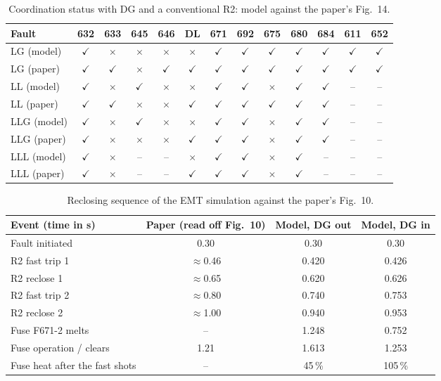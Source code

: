 \documentclass[12pt,a4paper]{article}
\newcommand{\ok}{\cellcolor{okc}$\checkmark$}
\newcommand{\no}{\cellcolor{noc}$\times$}
\begin{document}
\begin{table}[H]
\centering\footnotesize
\setlength{\tabcolsep}{4.5pt}
\begin{tabular}{|l|c|c|c|c|c|c|c|c|c|c|c|c|}
\hline
\textbf{Fault} & 632 & 633 & 645 & 646 & DL & 671 & 692 & 675 & 680 & 684 & 611 & 652 \\ \hline
LG (model) & \ok & \no & \no & \no & \no & \ok & \ok & \ok & \ok & \ok & \ok & \ok \\ \hline
LG (paper) & \ok & \ok & \no & \ok & \ok & \ok & \ok & \ok & \ok & \ok & \ok & \ok \\ \hline
LL (model) & \ok & \no & \ok & \no & \no & \ok & \ok & \no & \ok & \ok & -- & -- \\ \hline
LL (paper) & \ok & \ok & \no & \no & \ok & \ok & \ok & \ok & \ok & \ok & -- & -- \\ \hline
LLG (model) & \ok & \no & \ok & \no & \no & \ok & \ok & \no & \ok & \ok & -- & -- \\ \hline
LLG (paper) & \ok & \no & \no & \no & \ok & \ok & \ok & \no & \ok & \ok & -- & -- \\ \hline
LLL (model) & \ok & \no & -- & -- & \no & \ok & \ok & \no & \ok & -- & -- & -- \\ \hline
LLL (paper) & \ok & \no & -- & -- & \ok & \ok & \ok & \no & \ok & -- & -- & -- \\ \hline
\end{tabular}
\caption{Coordination status with DG and a conventional R2: model against the paper's Fig.~14.}
\label{tab:e5}
\end{table}

\begin{table}[H]
\centering\small
\begin{tabular}{|l|c|c|c|}
\hline
\textbf{Event (time in s)} & \textbf{Paper (read off Fig.~10)} & \textbf{Model, DG out} & \textbf{Model, DG in} \\ \hline
Fault initiated & 0.30 & 0.30 & 0.30 \\ \hline
R2 fast trip 1 & $\approx$0.46 & 0.420 & 0.426 \\ \hline
R2 reclose 1 & $\approx$0.65 & 0.620 & 0.626 \\ \hline
R2 fast trip 2 & $\approx$0.80 & 0.740 & 0.753 \\ \hline
R2 reclose 2 & $\approx$1.00 & 0.940 & 0.953 \\ \hline
Fuse F671-2 melts & -- & 1.248 & 0.752 \\ \hline
Fuse operation / clears & 1.21 & 1.613 & 1.253 \\ \hline
Fuse heat after the fast shots & -- & 45\,\% & 105\,\% \\ \hline
\end{tabular}
\caption{Reclosing sequence of the EMT simulation against the paper's Fig.~10.}
\label{tab:e6}
\end{table}
\end{document}
